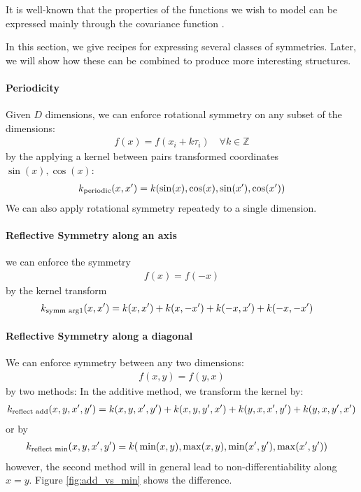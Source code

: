 
It is well-known that the properties of the functions we wish to model can be expressed mainly through the covariance function \cite{rasmussen38gaussian}.



In this section, we give recipes for expressing several classes of symmetries.  Later, we will show how these can be combined to produce more interesting structures.

\paragraph{Periodicity}
Given $D$ dimensions, we can enforce rotational symmetry on any subset of the dimensions:
%
\begin{align}
f(x) = f( x_i + k \tau_i) \quad \forall k \in \mathbb{Z}
\end{align}
%
by the applying a kernel between pairs transformed coordinates $\sin(x), \cos(x)$:
%
\begin{align}
k_{\textnormal{periodic}}(x, x') = k(\sin(x), \cos(x), \sin(x'), \cos(x'))
\end{align}
%
We can also apply rotational symmetry repeatedy to a single dimension.

\paragraph{Reflective Symmetry along an axis}
we can enforce the symmetry
\begin{align}
f(x) = f( -x)
\end{align}
%
by the kernel transform
%
\begin{align}
k_{\textnormal{symm arg1}}(x, x') & = k(x, x') + k(x, -x') + k(-x, x') + k(-x, -x')
\end{align}

\paragraph{Reflective Symmetry along a diagonal}
We can enforce symmetry between any two dimensions:
%
\begin{align}
f(x, y) = f( y, x)
\end{align}
%
by two methods:  In the additive method, we transform the kernel by:
%
\begin{align}
k_{\textnormal{reflect add}}(x, y, x', y') 
 = k(x, y, x', y') + k(x, y, y', x')
 + k(y, x, x', y') + k(y, x, y', x')
\end{align}
or by
\begin{align}
k_{\textnormal{reflect min}}(x, y, x', y') = k( & \min(x, y), \max(x,y), %
\min(x', y'), \max(x',y') )
\end{align}
however, the second method will in general lead to non-differentiability along $x = y$.  Figure \ref{fig:add_vs_min} shows the difference.

